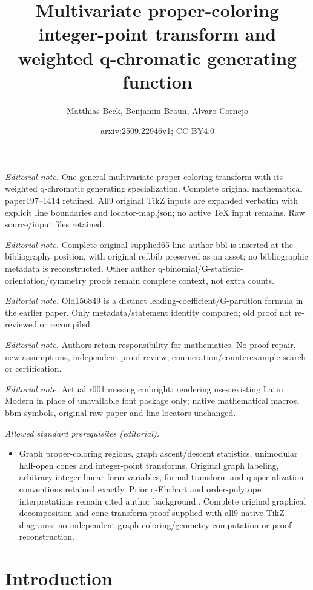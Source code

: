 \documentclass[11pt]{amsart}
\title{Multivariate proper-coloring integer-point transform and weighted q-chromatic generating function}
\author{Matthias Beck, Benjamin Braun, Alvaro Cornejo}
\date{arxiv:2509.22946v1; CC BY4.0}
\begin{document}
\maketitle
\noindent\textit{Editorial note.} One general multivariate proper-coloring transform with its weighted q-chromatic generating specialization. Complete original mathematical paper197--1414 retained. All9 original TikZ inputs are expanded verbatim with explicit line boundaries and locator-map.json; no active TeX input remains. Raw source/input files retained.\par\medskip
\noindent\textit{Editorial note.} Complete original supplied65-line author bbl is inserted at the bibliography position, with original ref.bib preserved as an asset; no bibliographic metadata is reconstructed. Other author q-binomial/G-statistic-orientation/symmetry proofs remain complete context, not extra counts.\par\medskip
\noindent\textit{Editorial note.} Old156849 is a distinct leading-coefficient/G-partition formula in the earlier paper. Only metadata/statement identity compared; old proof not re-reviewed or recompiled.\par\medskip
\noindent\textit{Editorial note.} Authors retain responsibility for mathematics. No proof repair, new assumptions, independent proof review, enumeration/counterexample search or certification.\par\medskip
\noindent\textit{Editorial note.} Actual r001 missing cmbright: rendering uses existing Latin Modern in place of unavailable font package only; native mathematical macros, bbm symbols, original raw paper and line locators unchanged.\par\medskip
\noindent\textit{Allowed standard prerequisites (editorial).}\begin{itemize}
\item Graph proper-coloring regions, graph ascent/descent statistics, unimodular half-open cones and integer-point transforms. Original graph labeling, arbitrary integer linear-form variables, formal transform and q-specialization conventions retained exactly. Prior q-Ehrhart and order-polytope interpretations remain cited author background.. Complete original graphical decomposition and cone-transform proof supplied with all9 native TikZ diagrams; no independent graph-coloring/geometry computation or proof reconstruction.
\end{itemize}\medskip
\section{Introduction}
\end{document}
